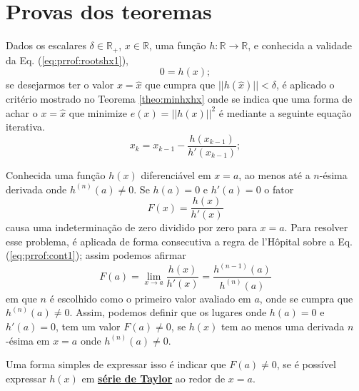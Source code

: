 \section{Provas dos teoremas}
 
\begin{myproofT}\label{proof:theo:rootshx}
Dados
os escalares $\delta \in \mathbb{R}_+$, 
$x \in \mathbb{R}$, 
uma função $h:\mathbb{R} \rightarrow \mathbb{R}$, e 
conhecida a validade da Eq. (\ref{eq:prrof:rootshx1}),
\begin{equation}\label{eq:prrof:rootshx1}
0=h(x);
\end{equation}
se desejarmos ter o valor $x=\hat{x}$ que cumpra que $||h(\hat{x})||<\delta$, 
é aplicado o critério mostrado no Teorema \ref{theo:minhxhx} onde se indica que uma forma de achar o 
$x=\hat{x}$ que minimize $e(x)=||h(x)||^2$ é mediante a seguinte equação iterativa.  
\begin{equation}\label{eq:prrof:rootshx1:2}
x_{k}=x_{k-1}-\frac{h(x_{k-1})}{h'(x_{k-1})};
\end{equation}

\end{myproofT}

\begin{myproofT}\label{proof:theo:cont:rootshx}
Conhecida uma função $h(x)$  diferenciável em $x=a$, 
ao menos até a $n$-ésima derivada onde $h^{(n)}(a)\neq 0$.
Se $h(a)=0$ e $h'(a)=0$ o fator
\begin{equation}\label{eq:prrof:cont1}
F(x)=\frac{h(x)}{h'(x)}
\end{equation}
causa uma indeterminação de zero dividido por zero para $x=a$.
Para resolver esse problema, é aplicada de forma consecutiva a regra de l'Hôpital
sobre a Eq. (\ref{eq:prrof:cont1}); assim podemos afirmar
\begin{equation}\label{eq:prrof:cont2}
F(a)=\lim_{x\rightarrow a}\frac{h(x)}{h'(x)}=\frac{h^{(n-1)}(a)}{h^{(n)}(a)}
\end{equation}
em que $n$ é escolhido como o primeiro valor avaliado em $a$, 
onde se cumpra que $h^{(n)}(a)\neq 0$. 
Assim, podemos definir que os lugares onde $h(a)=0$ e $h'(a)=0$,
 tem um valor $F(a)\neq 0$,
se $h(x)$ tem ao menos uma derivada $n$-ésima em $x=a$ onde $h^{(n)}(a)\neq 0$.

Uma forma simples de expressar isso é indicar que $F(a)\neq 0$, se é possível
expressar $h(x)$ em \hyperref[def:taylor]{\textbf{série de Taylor}} ao redor de $x=a$. 
\end{myproofT}

